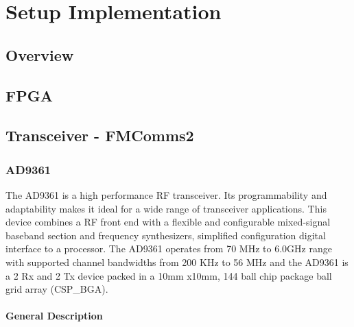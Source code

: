 \chapter{Setup Implementation}

\section{Overview}

\section{FPGA}

\section{Transceiver - FMComms2}
\subsection{AD9361}
\label{sec:ad9361}

The AD9361 is a high performance RF transceiver. Its programmability and adaptability makes it ideal for a wide range of transceiver applications. This device combines a RF front end with a flexible and configurable mixed-signal baseband section and frequency synthesizers, simplified configuration digital interface to a processor.
The AD9361 operates from 70 MHz to 6.0GHz range with supported channel bandwidths from 200 KHz to 56 MHz and the AD9361 is a 2 Rx and 2 Tx device packed in a 10mm x10mm, 144 ball chip package ball grid array (CSP\_BGA).

\subsubsection{General Description}


